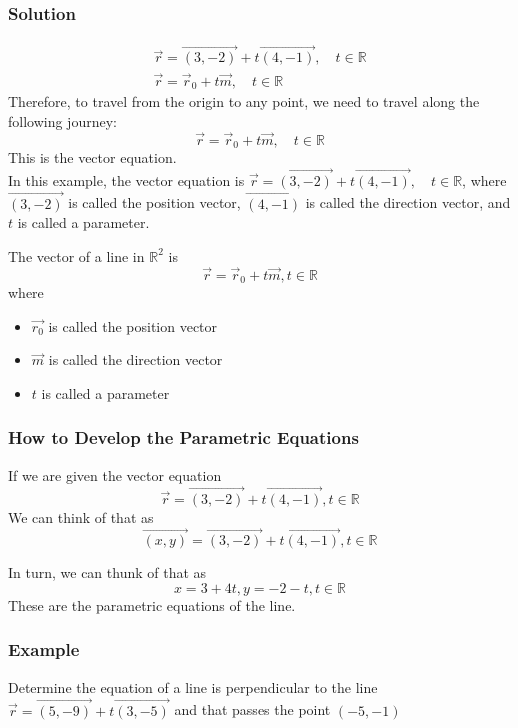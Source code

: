 \documentclass{article}
\begin{document}
\vspace{1cm}

\subsubsection*{Solution}
    \begin{align*}
        \vec{r} = \overrightarrow{(3,-2)} + t\overrightarrow{(4,-1)}, \quad t \in \mathbb{R} \\
        \vec{r} = \vec{r}_0 + t\vec{m}, \quad t \in \mathbb{R}
    \end{align*}
    Therefore, to travel from the origin to any point, we need to travel along the following journey:
    \[
        \vec{r} = \vec{r}_0 + t\vec{m}, \quad t \in \mathbb{R}
    \]
    This is the vector equation. \\
    In this example, the vector equation is $\vec{r} = \overrightarrow{(3,-2)} + t\overrightarrow{(4,-1)}, \quad t \in \mathbb{R}$, where $\overrightarrow{(3,-2)}$ is called the position vector, $\overrightarrow{(4,-1)}$ is called the direction vector, and $t$ is called a parameter.



\begin{tcolorbox}[colback=red!5!snow, colframe=red!50!white,
  colbacktitle=red!75!mistyrose]
The vector of a line in $\mathbb{R}^2$ is\\
\[
\vec{r} = \vec{r}_0 + t\vec{m}, t\in \mathbb{R}
\]
where 
\begin{itemize}
    \item  $\vec{r_0}$ is called the position vector 
    \item $\vec{m}$ is called the direction vector
    \item $t$ is called a parameter 
\end{itemize}
\end{tcolorbox}
\subsubsection{How to Develop the Parametric Equations }
If we are given the vector equation 
\[
    \vec{r}=\overrightarrow{(3,-2)}+t\overrightarrow{(4,-1)}, t \in \mathbb{R} 
\]
We can think of that as
\[
    \overrightarrow{(x,y)}=\overrightarrow{(3,-2)}+t\overrightarrow{(4,-1)}, t \in \mathbb{R}
\]

In turn, we can thunk of that as 
\[
    x=3+4t,y=-2-t,t\in \mathbb{R}
\]
These are the parametric equations of the line.
\subsubsection*{Example}
Determine the equation of a line is perpendicular to the line $\vec{r}=\overrightarrow{(5,-9)}+t\overrightarrow{(3,-5)}$ and that passes the point $(-5,-1)$
\end{document}
